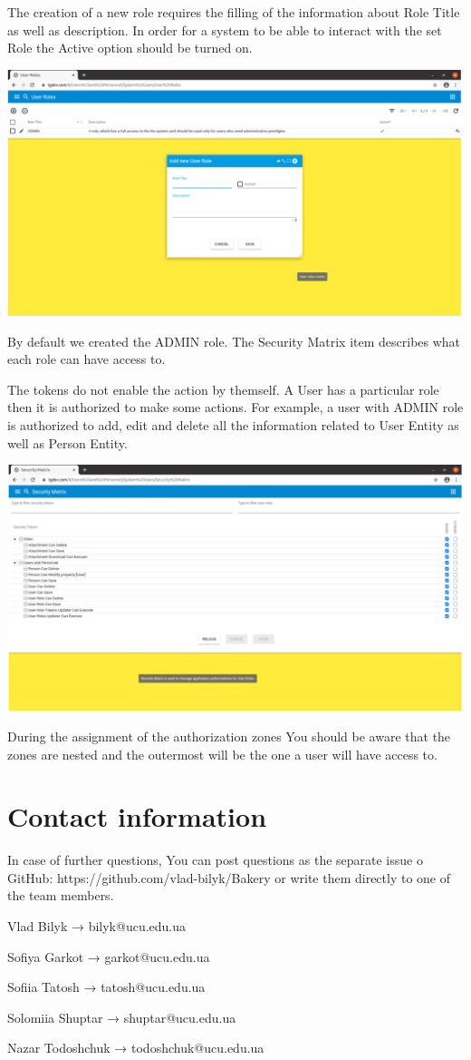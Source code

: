 The creation of a new role requires the filling of the information about Role Title as well as description. In order for a system to be able to interact with the set Role the Active option should be turned on.


\includegraphics[width=\textwidth]{sections/01-chapter/images/system4.png}

By default we created the ADMIN role. 
The Security Matrix item describes what each role can have access to. 

The tokens do not enable the action by themself. A User has a particular role then it is authorized to make some actions. For example, a user with ADMIN role is authorized to add, edit and delete all the information related to User Entity as well as Person Entity.  

\includegraphics[width=\textwidth]{sections/01-chapter/images/system5.png}

During the assignment of the authorization zones You should be aware that the zones are nested and the outermost will be the one a user will have access to. 

\section{Contact information}
In case of further questions, You can post questions as the separate issue o GitHub: https://github.com/vlad-bilyk/Bakery or write them directly to one of the team members. 

Vlad Bilyk  →  bilyk@ucu.edu.ua

Sofiya Garkot  →  garkot@ucu.edu.ua

Sofiia Tatosh  →  tatosh@ucu.edu.ua

Solomiia Shuptar  →  shuptar@ucu.edu.ua

Nazar Todoshchuk  →  todoshchuk@ucu.edu.ua

